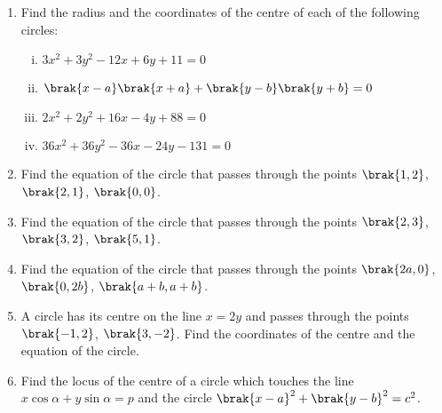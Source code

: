 \begin{enumerate}[1.]
\item Find the radius and the coordinates of the centre of each of the following circles:
\begin{enumerate}[(i)]
\item
$
3x^2+3y^2-12x+6y+11 = 0
$
\item
$
\brak{x-a}\brak{x+a} + \brak{y-b}\brak{y+b}=0
$
\item
$
2x^2+2y^2+16x-4y+88 = 0
$
\item
$
36x^2+36y^2-36x-24y-131 = 0
$
\end{enumerate}
\item Find the equation of the circle that passes through the points $\brak{1,2}$, $\brak{2,1}$, $\brak{0,0}$.
\item Find the equation of the circle that passes through  the points $\brak{2,3}$, $\brak{3,2}$, $\brak{5,1}$.
\item Find the equation of the circle that passes through the points $\brak{2a,0}$, $\brak{0,2b}$, $\brak{a+b,a+b}$.
\item A circle has its centre on the line $x=2y$ and passes through the points $\brak{-1,2}$, $\brak{3,-2}$.  Find the coordinates
of the centre and the equation of the circle.
\item Find the locus of the centre of a circle which touches the line 
$x\cos\alpha + y \sin\alpha =p$ and the circle $\brak{x-a}^2+\brak{y-b}^2=c^2$.
\end{enumerate}